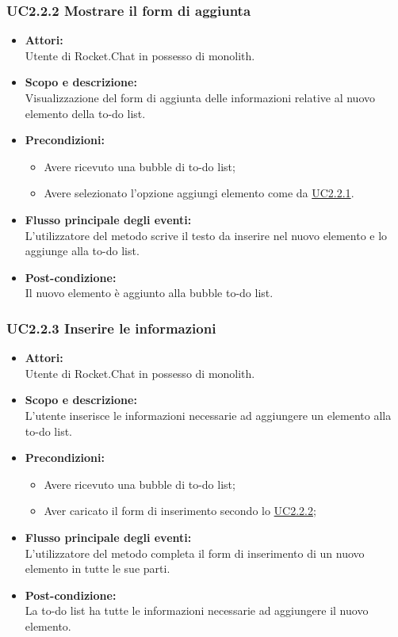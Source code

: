 \subsubsection{UC2.2.2 Mostrare il form di aggiunta} \label{UC2.2.2}

\begin{itemize}
	\item \textbf{Attori:}
	\\Utente di Rocket.Chat in possesso di monolith.
	\item \textbf{Scopo e descrizione:} 
	\\Visualizzazione del form di aggiunta delle informazioni relative al nuovo elemento della to-do list.
	\item \textbf{Precondizioni:}
	\begin{itemize}
		\item Avere ricevuto una bubble di to-do list;
		\item Avere selezionato l'opzione aggiungi elemento come da \hyperref[UC2.2.1]{UC2.2.1}.
	\end{itemize}
	\item \textbf{Flusso principale degli eventi:}
	\\L’utilizzatore del metodo scrive il testo da inserire nel nuovo elemento e lo aggiunge alla to-do list.
	\item \textbf{Post-condizione:}
	\\Il nuovo elemento è aggiunto alla bubble to-do list.
\end{itemize}

\subsubsection{UC2.2.3  Inserire le informazioni} \label{UC2.2.3}

\begin{itemize}
	\item \textbf{Attori:}
	\\Utente di Rocket.Chat in possesso di monolith.
	\item \textbf{Scopo e descrizione:} 
	\\L’utente inserisce le informazioni necessarie ad aggiungere un elemento alla to-do list.
	\item \textbf{Precondizioni:}
	\begin{itemize}
		\item Avere ricevuto una bubble di to-do list;
		\item Aver caricato il form di inserimento secondo lo \hyperref[UC2.2.2]{UC2.2.2};
	\end{itemize}
	\item \textbf{Flusso principale degli eventi:}
	\\L’utilizzatore del metodo completa il form di inserimento di un nuovo elemento in tutte le sue parti.
	\item \textbf{Post-condizione:}
	\\La to-do list ha tutte le informazioni necessarie ad aggiungere il nuovo elemento.
\end{itemize}

